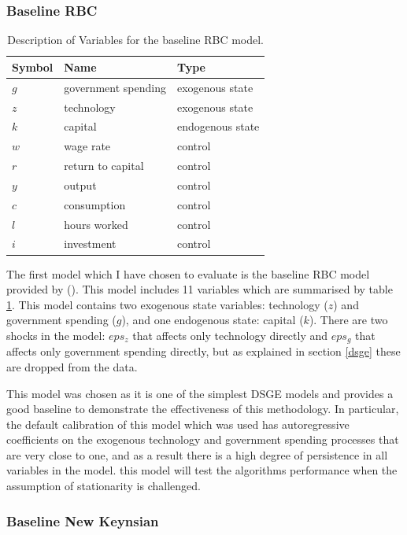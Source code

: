 \documentclass{article}
\begin{document}
\subsubsection{Baseline RBC}

\begin{table}
  \centering
  \begin{tabular}{|l|l|l|}
    \hline
    Symbol & Name & Type \\
    \hline
    $g$ & government spending & exogenous state \\
    $z$ & technology & exogenous state \\
    $k$ & capital & endogenous state \\
    $w$ & wage rate & control \\
    $r$ & return to capital & control \\
    $y$ & output & control \\
    $c$ & consumption & control \\
    $l$ & hours worked & control \\
    $i$ & investment & control \\ \cline{2-2}
    \hline
  \end{tabular}
  \caption{Description of Variables for the baseline RBC model.}
  \label{rbc_data}
\end{table}

The first model which I have chosen to evaluate is the baseline RBC model provided by \citeauthor{pfeifer2020} (\citeyear{pfeifer2020}). This model includes 11 variables which are summarised by table \ref{rbc_data}. This model contains two exogenous state variables: technology ($z$) and government spending ($g$), and one endogenous state: capital ($k$). There are two shocks in the model: $eps_z$ that affects only technology directly and $eps_g$ that affects only government spending directly, but as explained in section \ref{dsge} these are dropped from the data.

This model was chosen as it is one of the simplest DSGE models and provides a good baseline to demonstrate the effectiveness of this methodology. In particular, the default calibration of this model which was used has autoregressive coefficients on the exogenous technology and government spending processes that are very close to one, and as a result there is a high degree of persistence in all variables in the model. this model will test the algorithms performance when the assumption of stationarity is challenged.

\subsubsection{Baseline New Keynsian}
\end{document}
